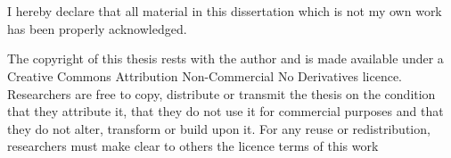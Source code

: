 
\chapter*{ }

\vspace*{-3cm}


\medskip

\noindent I hereby declare that all material in this dissertation which is not my own work has been properly acknowledged.

\vspace*{2cm}


\medskip

\noindent The copyright of this thesis rests with the author and is made available under a Creative Commons Attribution Non-Commercial No Derivatives licence. Researchers are free to copy, distribute or transmit the thesis on the condition that they attribute it, that they do not use it for commercial purposes and that they do not alter, transform or build upon it. For any reuse or redistribution, researchers must make clear to others the licence terms of this work

